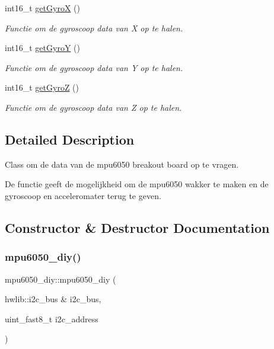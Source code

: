 \begin{DoxyCompactItemize}
int16\+\_\+t \hyperlink{classmpu6050__diy_a048c65dd8d76a6296278764fa186ab14}{get\+GyroX} ()
\begin{DoxyCompactList}\small\item\em Functie om de gyroscoop data van X op te halen. \end{DoxyCompactList}\item 
int16\+\_\+t \hyperlink{classmpu6050__diy_af83663d474f4d05b06517cc50faad681}{get\+GyroY} ()
\begin{DoxyCompactList}\small\item\em Functie om de gyroscoop data van Y op te halen. \end{DoxyCompactList}\item 
int16\+\_\+t \hyperlink{classmpu6050__diy_a8cd5eabaff15a4fb17d06bc5d9b6f280}{get\+GyroZ} ()
\begin{DoxyCompactList}\small\item\em Functie om de gyroscoop data van Z op te halen. \end{DoxyCompactList}\end{DoxyCompactItemize}


\subsection{Detailed Description}
Class om de data van de mpu6050 breakout board op te vragen. 

De functie geeft de mogelijkheid om de mpu6050 wakker te maken en de gyroscoop en acceleromater terug te geven. 

\subsection{Constructor \& Destructor Documentation}
\mbox{\label{classmpu6050__diy_a8e7f3cddfb5d527053939d0c7ba72434}} 
\subsubsection{\texorpdfstring{mpu6050\+\_\+diy()}{mpu6050\_diy()}}
{\footnotesize\ttfamily mpu6050\+\_\+diy\+::mpu6050\+\_\+diy (\begin{DoxyParamCaption}\item[{hwlib\+::i2c\+\_\+bus \&}]{i2c\+\_\+bus,  }\item[{uint\+\_\+fast8\+\_\+t}]{i2c\+\_\+address }\end{DoxyParamCaption})\hspace{0.3cm}{\ttfamily [inline]}}



